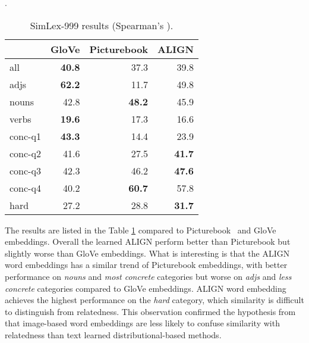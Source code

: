 \documentclass{article}
\begin{document}
\begin{table}[h]
\begin{center}
\caption{SimLex-999 results (Spearman’s ).}
\label{tab:simlex}.
\begin{small}
\begin{tabular}{l|rrr}
\toprule
            & GloVe & Picturebook & \textbf{ALIGN} \\
\midrule
all         & \textbf{40.8} & 37.3 & 39.8 \\
adjs        & \textbf{62.2} & 11.7 & 49.8 \\
nouns       & 42.8 & \textbf{48.2} & 45.9 \\
verbs       & \textbf{19.6} & 17.3 & 16.6 \\
conc-q1     & \textbf{43.3} & 14.4 & 23.9 \\
conc-q2     & 41.6 & 27.5 & \textbf{41.7} \\
conc-q3     & 42.3 & 46.2 & \textbf{47.6} \\
conc-q4     & 40.2 & \textbf{60.7} & 57.8 \\
hard        & 27.2 & 28.8 & \textbf{31.7}\\
\bottomrule
\end{tabular}
\end{small}
\end{center}
\vskip -0.1in
\end{table}

The results are listed in the Table \ref{tab:simlex} compared to Picturebook~\cite{kiros:picturebook} and GloVe~\cite{pennington:glove} embeddings. Overall the learned ALIGN perform better than Picturebook but slightly worse than GloVe embeddings. What is interesting is that the ALIGN word embeddings has a similar trend of Picturebook embeddings, with better performance on \textit{nouns} and \textit{most concrete} categories but worse on \textit{adjs} and \textit{less concrete} categories compared to GloVe embeddings. 
ALIGN word embedding achieves the highest performance on the \textit{hard} category, which similarity is difficult to distinguish from relatedness. This observation confirmed the hypothesis from \citet{kiros:picturebook} that image-based word embeddings are less likely to confuse similarity with relatedness than text learned distributional-based methods. 
\end{document}
